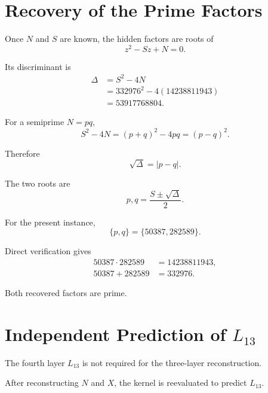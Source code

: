 \documentclass[11pt,a4paper]{article}
\theoremstyle{definition}
\theoremstyle{remark}
\begin{document}
\section{Recovery of the Prime Factors}

Once $N$ and $S$ are known, the hidden factors are roots of
\begin{equation}
z^2-Sz+N=0.
\end{equation}

Its discriminant is
\begin{align}
\Delta
&=S^2-4N\\
&=332976^2-4(14238811943)\\
&=53917768804.
\end{align}

For a semiprime $N=pq$,
\begin{equation}
S^2-4N
=
(p+q)^2-4pq
=
(p-q)^2.
\end{equation}

Therefore
\begin{equation}
\sqrt{\Delta}=|p-q|.
\end{equation}

The two roots are
\begin{equation}
p,q
=
\frac{S\pm\sqrt{\Delta}}{2}.
\end{equation}

For the present instance,
\begin{equation}
\boxed{
\{p,q\}=\{50387,282589\}.
}
\end{equation}

Direct verification gives
\begin{align}
50387\cdot282589
&=14238811943,\\
50387+282589
&=332976.
\end{align}

Both recovered factors are prime.

\section{Independent Prediction of $L_{13}$}

The fourth layer $L_{13}$ is not required for the three-layer reconstruction.

After reconstructing $N$ and $X$, the kernel is reevaluated to predict
$L_{13}$.
\end{document}
